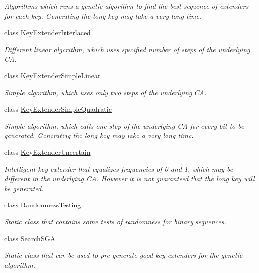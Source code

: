 \begin{DoxyCompactItemize}
\begin{DoxyCompactList}\small\item\em Algorithms which runs a genetic algorithm to find the best sequence of extenders for each key. Generating the long key may take a very long time. \end{DoxyCompactList}\item 
class \hyperlink{class_crypto_1_1_key_extender_interlaced}{Key\+Extender\+Interlaced}
\begin{DoxyCompactList}\small\item\em Different linear algorithm, which uses specified number of steps of the underlying C\+A. \end{DoxyCompactList}\item 
class \hyperlink{class_crypto_1_1_key_extender_simple_linear}{Key\+Extender\+Simple\+Linear}
\begin{DoxyCompactList}\small\item\em Simple algorithm, which uses only two steps of the underlying C\+A. \end{DoxyCompactList}\item 
class \hyperlink{class_crypto_1_1_key_extender_simple_quadratic}{Key\+Extender\+Simple\+Quadratic}
\begin{DoxyCompactList}\small\item\em Simple algorithm, which calls one step of the underlying C\+A for every bit to be generated. Generating the long key may take a very long time. \end{DoxyCompactList}\item 
class \hyperlink{class_crypto_1_1_key_extender_uncertain}{Key\+Extender\+Uncertain}
\begin{DoxyCompactList}\small\item\em Intelligent key extender that equalizes frequencies of 0 and 1, which may be different in the underlying C\+A. However it is not guaranteed that the long key will be generated. \end{DoxyCompactList}\item 
class \hyperlink{class_crypto_1_1_randomness_testing}{Randomness\+Testing}
\begin{DoxyCompactList}\small\item\em Static class that contains some tests of randomness for binary sequences. \end{DoxyCompactList}\item 
class \hyperlink{class_crypto_1_1_search_s_g_a}{Search\+S\+G\+A}
\begin{DoxyCompactList}\small\item\em Static class that can be used to pre-\/generate good key extenders for the genetic algorithm. \end{DoxyCompactList}\end{DoxyCompactItemize}
